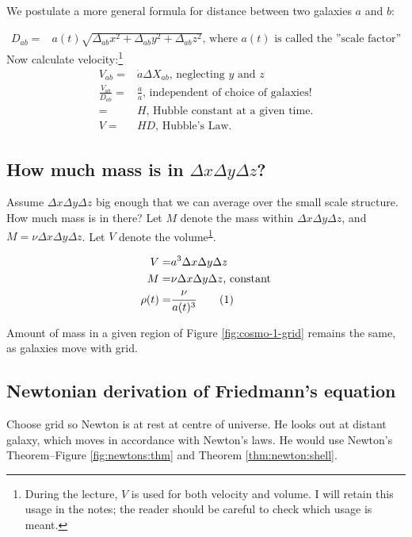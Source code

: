 \documentclass[]{article}
\newcommand\numberthis{\addtocounter{equation}{1}\tag{\theequation}}
\begin{document}
 We postulate a more general formula for distance between two galaxies $a$ and $b$:
 
 \begin{align*}            
 	D_{ab}=&a(t) \sqrt{\Delta_{ab} x^2 + \Delta_{ab} y^2 + \Delta_{ab} z^2}  \text{, where $a(t)$ is called the ''scale factor''}
\end{align*}
 Now calculate velocity:\footnote{\label{note1}During the lecture, $V$ is used for both velocity and volume. I will retain this usage in the notes; the reader should be careful to check which usage is meant.}           
 \begin{align*}	
 	V_{ab}=&\dot{a} \Delta X_{ab} \text{, neglecting $y$ and $z$}\\
 	\frac{V_{ab}}{D_{ab}} =& \frac{\dot{a}}{a} \text{, independent of choice of galaxies!}\\
 	=& H \text{, Hubble constant at a given time.}\\
 	V =& H D \text{, Hubble's Law.}
\end{align*}
 
\subsection{How much mass is in $\Delta x \Delta y \Delta z$?}

Assume  $\Delta x \Delta y \Delta z$ big enough that we can average over the small scale structure. How much mass is in there? Let $M$ denote the mass within $\Delta x \Delta y \Delta z$, and $M = \nu \Delta x \Delta y \Delta z$. Let $V$ denote the volume\textsuperscript{\ref{note1}}.

\begin{align*}
	V =& a^3 \Delta x \Delta y \Delta z\\
	M =& \nu \Delta x \Delta y \Delta z \text{, constant}\\
	\rho(t) =& \frac{\nu}{a(t)^3} \numberthis \label{eq:rho}
\end{align*}

Amount of mass in a given region of Figure \ref{fig:cosmo-1-grid} remains the same, as galaxies move with grid.

\subsection{Newtonian derivation of Friedmann's equation}
Choose grid so Newton is at rest at centre of universe. He looks out at distant galaxy, which moves in accordance with Newton's laws. He would use Newton's Theorem--Figure \ref{fig:newtons:thm} and Theorem \ref{thm:newton:shell}.
\end{document}
